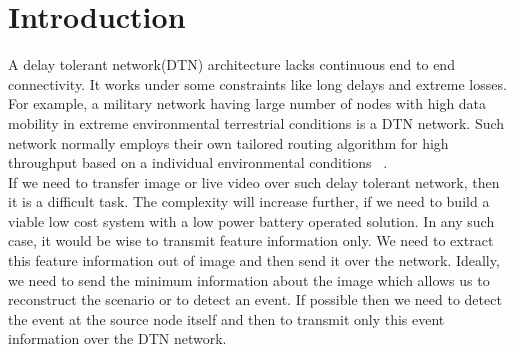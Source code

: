 
\chapter{Introduction} %
\label{Chapter1}

\indent A delay tolerant network(DTN) architecture lacks continuous end
to end connectivity. It works under some constraints like long delays
and extreme losses. For example, a military network having large number
of nodes with high data mobility in extreme environmental terrestrial
conditions is a DTN network. Such network normally employs their own
tailored routing algorithm for high throughput based on a individual
environmental conditions ~\cite{1}.\\

\indent If we need to transfer image or live video over such delay
tolerant network, then it is a difficult task. The complexity will
increase further, if we need to build a viable low cost system with a
low power battery operated solution.  In any such case, it would be wise
to transmit feature information only. We need to extract this feature
information out of image and then send it over the network.  Ideally, we
need to send the minimum information about the image which allows us to
reconstruct the scenario or to detect an event. If possible then we need
to detect the event at the source node itself and then to transmit only
this event information over the DTN network.\\


